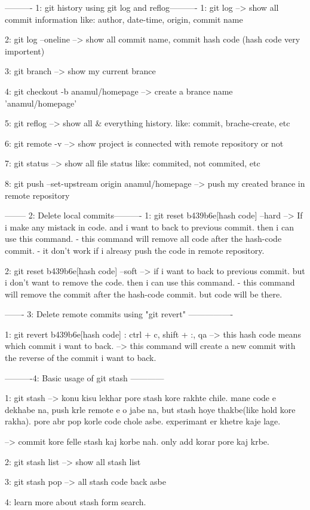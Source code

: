 ----------  1: git history using git log and reflog----------
1: git log
--> show all commit information like: author, date-time, origin, commit name

2: git log --oneline
--> show all commit name, commit hash code (hash code very importent)

3: git branch
--> show my current brance 

4: git checkout -b anamul/homepage
--> create a brance name 'anamul/homepage'

5: git reflog
--> show all & everything history. like: commit, brache-create, etc

6: git remote -v
--> show project is connected with remote repository or not

7: git status
--> show all file status like: commited, not commited, etc

8: git push --set-upstream origin anamul/homepage
--> push my created brance in remote repository



--------  2: Delete local commits----------
1: git reset b439b6e[hash code] --hard
--> If i make any mistack in code. and i want to back to previous commit. then i can use this command. 
    - this command will remove all code after the hash-code commit.
    - it don't work if i alreasy push the code in remote repository.

2: git reset b439b6e[hash code] --soft
--> if i want to back to previous commit. but i don't want to remove the code. then i can use this command.
    - this command will remove the commit after the hash-code commit. but code will be there.


------- 3: Delete remote commits using "git revert" ----------------

1: git revert b439b6e[hash code]
    : ctrl + c,  shift + :, qa
--> this hash code means which commit i want to back.
--> this command will create a new commit with the reverse of the commit i want to back.


----------4: Basic usage of git stash ------------

1: git stash
--> konu kisu lekhar pore stash kore rakhte chile. mane code e dekhabe na, push krle remote e o jabe na, but stash hoye thakbe(like hold kore rakha). pore abr pop korle code chole asbe. experimant er khetre kaje lage.

--> commit kore felle stash kaj korbe nah. only add korar pore kaj krbe.

2: git stash list
--> show all stash list

3: git stash pop
--> all stash code back asbe

4: learn more about stash form search.
